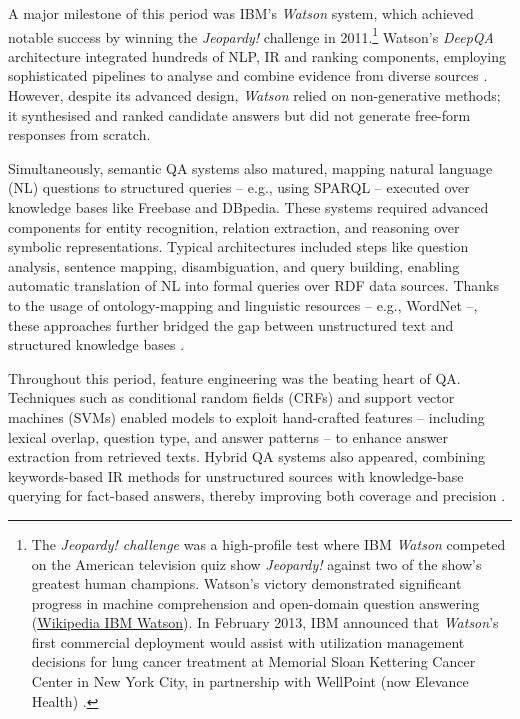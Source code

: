 \begin{spacing}{1.5}
A major milestone of this period was IBM's \textit{Watson} system, which achieved notable success by winning the \textit{Jeopardy!} challenge in 2011.\footnote{The \textit{Jeopardy! challenge} was a high-profile test where IBM \textit{Watson} competed on the American television quiz show \textit{Jeopardy!} against two of the show's greatest human champions. Watson’s victory demonstrated significant progress in machine comprehension and open-domain question answering (\href{https://en.wikipedia.org/w/index.php?title=IBM_Watson&oldid=1301611671}{Wikipedia IBM Watson}). In February 2013, IBM announced that \textit{Watson}'s first commercial deployment would assist with utilization management decisions for lung cancer treatment at Memorial Sloan Kettering Cancer Center in New York City, in partnership with WellPoint (now Elevance Health) \citep{upbin_ibms_2013}.} Watson’s \textit{DeepQA} architecture integrated hundreds of NLP, IR and ranking components, employing sophisticated pipelines to analyse and combine evidence from diverse sources \citep{ferrucci_building_2011}. However, despite its advanced design, \textit{Watson} relied on non-generative methods; it synthesised and ranked candidate answers but did not generate free-form responses from scratch.

Simultaneously, semantic QA systems also matured, mapping natural language (NL) questions to structured queries  -- e.g., using SPARQL -- executed over knowledge bases like Freebase and DBpedia. These systems required advanced components for entity recognition, relation extraction, and reasoning over symbolic representations. Typical architectures included steps like question analysis, sentence mapping, disambiguation, and query building, enabling automatic translation of NL into formal queries over RDF data sources. Thanks to the usage of ontology-mapping and linguistic resources -- e.g., WordNet --, these approaches further bridged the gap between unstructured text and structured knowledge bases \citep{franco_ontology-based_2020}.

Throughout this period, feature engineering was the beating heart of QA. Techniques such as conditional random fields (CRFs) and support vector machines (SVMs) enabled models to exploit hand-crafted features -- including lexical overlap, question type, and answer patterns -- to enhance answer extraction from retrieved texts. Hybrid QA systems also appeared, combining keywords-based IR methods for unstructured sources with knowledge-base querying for fact-based answers, thereby improving both coverage and precision \citep{antoniou_survey_2022}.


\end{spacing}
